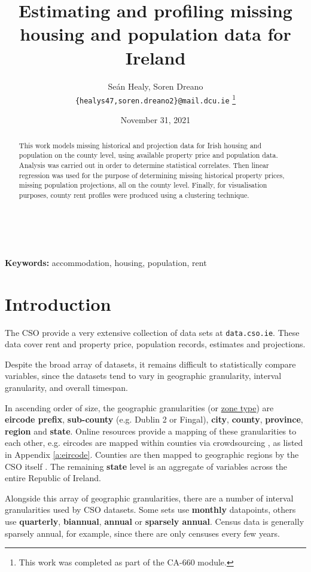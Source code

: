 \documentclass[twocolumn]{article}
\date{November 31, 2021}
\title{Estimating and profiling missing housing and population data for Ireland}
\author{
    Seán Healy, Soren Dreano\\
    \texttt{\{healys47,soren.dreano2\}@mail.dcu.ie}
    \footnote{This work was completed as part of the CA-660 module.}
}
\begin{document}
\maketitle
\begin{abstract}
This work models missing historical and projection data for Irish
housing and population on the county level, using available
property price and population data.  Analysis was
carried out in order to determine statistical correlates.  Then linear
regression was used for the purpose of determining missing historical property
prices, missing population projections,
all on the county level.  Finally, for visualisation purposes, county rent
profiles were produced using a clustering technique.
\end{abstract}\\\\
{\bf Keywords:} accommodation, housing, population, rent

\section{Introduction\label{s:intro}}
The CSO provide a very extensive collection of data sets at
{\tt data.cso.ie}.  These data cover rent and property price, population
records, estimates and projections.

Despite the broad array of datasets, it remains difficult to statistically
compare variables, since the datasets tend to vary in geographic granularity,
interval granularity, and overall timespan.

In ascending order of size, the geographic granularities (or \underline{zone type}) are {\bf eircode prefix},
{\bf sub-county} (e.g. Dublin 2 or Fingal), {\bf city}, {\bf county}, {\bf province}, {\bf region} and {\bf state}.  Online resources provide a mapping of
these granularities to each other, e.g. eircodes are mapped within counties via crowdsourcing
\cite{eircode19}, as listed in Appendix \ref{a:eircode}.  Counties are then mapped to geographic
regions by the CSO itself \cite{cso_regions}.  The remaining {\bf state} level is an aggregate of variables
across the entire Republic of Ireland.

Alongside this array of geographic granularities, there are a number of interval granularities used by CSO
datasets.  Some sets use {\bf monthly} datapoints, others use {\bf quarterly}, {\bf biannual}, {\bf annual}
or {\bf sparsely annual}.  Census data is generally sparsely annual, for example, since there are only
censuses every few years.
\end{document}
